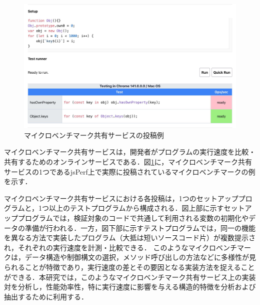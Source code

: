 \documentclass[submit,techrep,noauthor]{ipsj}
\newcommand{\todo}[1]{\colorbox{yellow}{{\bf TODO}:}{\color{red} {\textbf{[#1]}}}}
\begin{document}
\begin{figure}[t]
    \centering
    \includegraphics[width=1.0\linewidth]{./Noguchi_fig/jsPerf_example.pdf}
    \caption{マイクロベンチマーク共有サービスの投稿例\protect\footnotemark}
    \label{fig:jsPerf}
\end{figure}


マイクロベンチマーク共有サービスは，開発者がプログラムの実行速度を比較・共有するためのオンラインサービスである．図\ref{fig:jsPerf}に，マイクロベンチマーク共有サービスの1つであるjsPerf上で実際に投稿されているマイクロベンチマークの例を示す．

マイクロベンチマーク共有サービスにおける各投稿は，1つのセットアッププログラムと，1つ以上のテストプログラムから構成される．図上部に示すセットアッププログラムでは，検証対象のコードで共通して利用される変数の初期化やデータの準備が行われる．一方，図下部に示すテストプログラムでは，同一の機能を異なる方法で実装したプログラム（大抵は短いソースコード片）が複数提示され，それぞれの実行速度を計測・比較できる．
このようなマイクロベンチマークは，データ構造や制御構文の選択，メソッド呼び出しの方法などに多様性が見られることが特徴であり，実行速度の差とその要因となる実装方法を捉えることができる．本研究では，このようなマイクロベンチマーク共有サービス上の実装対を分析し，性能効率性，特に実行速度に影響を与える構造的特徴を分析および抽出するために利用する．


\end{document}
